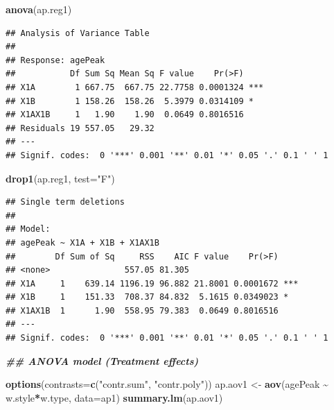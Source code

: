 \documentclass[
]{book}
\newenvironment{Shaded}{\begin{snugshade}}{\end{snugshade}}
\newcommand{\AttributeTok}[1]{\textcolor[rgb]{0.13,0.29,0.53}{#1}}
\newcommand{\DocumentationTok}[1]{\textcolor[rgb]{0.56,0.35,0.01}{\textbf{\textit{#1}}}}
\newcommand{\FunctionTok}[1]{\textcolor[rgb]{0.13,0.29,0.53}{\textbf{#1}}}
\newcommand{\NormalTok}[1]{#1}
\newcommand{\OtherTok}[1]{\textcolor[rgb]{0.56,0.35,0.01}{#1}}
\newcommand{\SpecialCharTok}[1]{\textcolor[rgb]{0.81,0.36,0.00}{\textbf{#1}}}
\newcommand{\StringTok}[1]{\textcolor[rgb]{0.31,0.60,0.02}{#1}}
\begin{document}
\begin{Shaded}
\begin{Highlighting}[]
\FunctionTok{anova}\NormalTok{(ap.reg1)}
\end{Highlighting}
\end{Shaded}

\begin{verbatim}
## Analysis of Variance Table
## 
## Response: agePeak
##           Df Sum Sq Mean Sq F value    Pr(>F)    
## X1A        1 667.75  667.75 22.7758 0.0001324 ***
## X1B        1 158.26  158.26  5.3979 0.0314109 *  
## X1AX1B     1   1.90    1.90  0.0649 0.8016516    
## Residuals 19 557.05   29.32                      
## ---
## Signif. codes:  0 '***' 0.001 '**' 0.01 '*' 0.05 '.' 0.1 ' ' 1
\end{verbatim}

\begin{Shaded}
\begin{Highlighting}[]
\FunctionTok{drop1}\NormalTok{(ap.reg1, }\AttributeTok{test=}\StringTok{"F"}\NormalTok{)}
\end{Highlighting}
\end{Shaded}

\begin{verbatim}
## Single term deletions
## 
## Model:
## agePeak ~ X1A + X1B + X1AX1B
##        Df Sum of Sq     RSS    AIC F value    Pr(>F)    
## <none>               557.05 81.305                      
## X1A     1    639.14 1196.19 96.882 21.8001 0.0001672 ***
## X1B     1    151.33  708.37 84.832  5.1615 0.0349023 *  
## X1AX1B  1      1.90  558.95 79.383  0.0649 0.8016516    
## ---
## Signif. codes:  0 '***' 0.001 '**' 0.01 '*' 0.05 '.' 0.1 ' ' 1
\end{verbatim}

\begin{Shaded}
\begin{Highlighting}[]
\DocumentationTok{\#\# ANOVA model (Treatment effects)}

\FunctionTok{options}\NormalTok{(}\AttributeTok{contrasts=}\FunctionTok{c}\NormalTok{(}\StringTok{"contr.sum"}\NormalTok{, }\StringTok{"contr.poly"}\NormalTok{))}
\NormalTok{ap.aov1 }\OtherTok{\textless{}{-}} \FunctionTok{aov}\NormalTok{(agePeak }\SpecialCharTok{\textasciitilde{}}\NormalTok{ w.style}\SpecialCharTok{*}\NormalTok{w.type, }\AttributeTok{data=}\NormalTok{ap1)}
\FunctionTok{summary.lm}\NormalTok{(ap.aov1)}
\end{Highlighting}
\end{Shaded}
\end{document}
